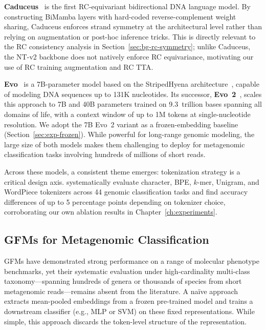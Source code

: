 \textbf{Caduceus}~\cite{Schiff2024caduceus} is the first RC-equivariant bidirectional DNA language model. By constructing BiMamba layers with hard-coded reverse-complement weight sharing, Caduceus enforces strand symmetry at the architectural level rather than relying on augmentation or post-hoc inference tricks. This is directly relevant to the RC consistency analysis in Section~\ref{sec:bg-rc-symmetry}; unlike Caduceus, the NT-v2 backbone does not natively enforce RC equivariance, motivating our use of RC training augmentation and RC TTA.

\textbf{Evo}~\cite{Nguyen2024} is a 7B-parameter model based on the StripedHyena architecture~\cite{Poli2024}, capable of modeling DNA sequences up to 131K nucleotides. Its successor, \textbf{Evo~2}~\cite{Brixi2025}, scales this approach to 7B and 40B parameters trained on 9.3~trillion bases spanning all domains of life, with a context window of up to 1M tokens at single-nucleotide resolution. We adopt the 7B Evo~2 variant as a frozen-embedding baseline (Section~\ref{sec:exp-frozen}). While powerful for long-range genomic modeling, the large size of both models makes them challenging to deploy for metagenomic classification tasks involving hundreds of millions of short reads.

Across these models, a consistent theme emerges: tokenization strategy is a critical design axis. \textcite{Lindsey2025tokenizer} systematically evaluate character, BPE, $k$-mer, Unigram, and WordPiece tokenizers across 44 genomic classification tasks and find accuracy differences of up to 5 percentage points depending on tokenizer choice, corroborating our own ablation results in Chapter~\ref{ch:experiments}.

\subsection{GFMs for Metagenomic Classification}
\label{sec:bg-gfm-metagenomics}

GFMs have demonstrated strong performance on a range of molecular phenotype benchmarks, yet their systematic evaluation under high-cardinality multi-class taxonomy---spanning hundreds of genera or thousands of species from short metagenomic reads---remains absent from the literature. A naïve approach extracts mean-pooled embeddings from a frozen pre-trained model and trains a downstream classifier (e.g., MLP or SVM) on these fixed representations. While simple, this approach discards the token-level structure of the representation.

